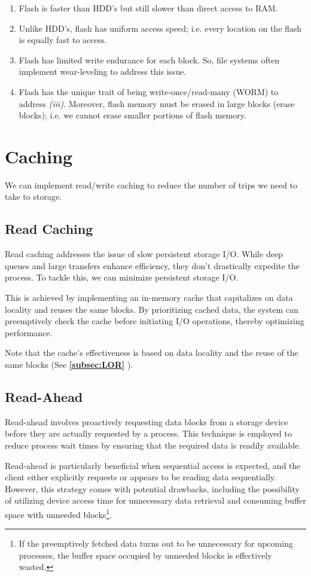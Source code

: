 \documentclass{report}
\newcommand{\refto}[2]{\textbf{\ref{#1:#2} \nameref{#1:#2}}}
\begin{document}
\begin{enumerate}[label=\textit{(\roman*)}]
\item Flash is faster than HDD's  but still slower than direct access to RAM.
\item Unlike HDD's, flash has uniform access speed; i.e. every location on the flash is equally fast
  to access.
\item Flash has limited write endurance for each block. So, file systems often implement
  wear-leveling to address this issue.
\item Flash has the unique trait of being write-once/read-many (WORM) to address
  \textit{(iii)}. Moreover, flash memory must be erased in large blocks (erase blocks); i.e. we
  cannot erase smaller portions of flash memory.
\end{enumerate}


\section{Caching}
We can implement read/write caching to reduce the number of trips we need to take to storage.

\subsection{Read Caching}
Read caching addresses the issue of slow persistent storage I/O. While deep queues and large
transfers enhance efficiency, they don't drastically expedite the process. To tackle this, we can
minimize persistent storage I/O.

This is achieved by implementing an in-memory cache that capitalizes on data locality and reuses the
same blocks. By prioritizing cached data, the system can preemptively check the cache before
initiating I/O operations, thereby optimizing performance.

Note that the cache's effectiveness is based on data locality and the reuse of the same blocks (See
\refto{subsec}{LOR}).


\subsection{Read-Ahead}
Read-ahead involves proactively requesting data blocks from a storage device before they are
actually requested by a process. This technique is employed to reduce process wait times by ensuring
that the required data is readily available.

Read-ahead is particularly beneficial when sequential access is expected, and the client either
explicitly requests or appears to be reading data sequentially. However, this strategy comes with
potential drawbacks, including the possibility of utilizing device access time for unnecessary data
retrieval and consuming buffer space with unneeded blocks\footnote{If the preemptively fetched data
turns out to be unnecessary for upcoming processes, the buffer space occupied by unneeded blocks is
effectively wasted.}.
\end{document}
